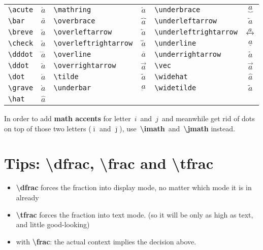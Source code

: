\vspace{0.5em}\noindent
\begin{tabularx}{\textwidth}{Xc|Xc|Xc}
 \verb|\acute| & $\acute{a}$ & \verb|\mathring| & $\mathring{a}$ & \verb|\underbrace| & $\underbrace{a}$ \\
 \verb|\bar| & $\bar{a}$ & \verb|\overbrace| & $\overbrace{a}$ & \verb|\underleftarrow| & $\underleftarrow{a}$ \\
 \verb|\breve| & $\breve{a}$ & \verb|\overleftarrow| & $\overleftarrow{a}$ & \verb|\underleftrightarrow| & $\underleftrightarrow{a}$ \\
 \verb|\check| & $\check{a}$ & \verb|\overleftrightarrow| & $\overleftrightarrow{a}$ & \verb|\underline| & $\underline{a}$ \\
 \verb|\dddot| & $\dddot{a}$ & \verb|\overline| & $\overline{a}$ & \verb|\underrightarrow| & $\underrightarrow{a}$ \\
 \verb|\ddot| & $\ddot{a}$ & \verb|\overrightarrow| & $\overrightarrow{a}$ & \verb|\vec| & $\vec{a}$ \\
 \verb|\dot| & $\dot{a}$ & \verb|\tilde| & $\tilde{a}$ & \verb|\widehat| & $\widehat{a}$ \\
 \verb|\grave| & $\grave{a}$ & \verb|\underbar| & $\underbar{a}$ & \verb|\widetilde| & $\widetilde{a}$ \\
 \verb|\hat| & $\hat{a}$
\end{tabularx}\vspace{0.5em}

In order to add \textbf{math accents} for letter~$i$~and~$j$~and meanwhile get rid of dots on top of those two letters ($\bar{\imath}$ and $\bar{\jmath}$), use~\textbf{\textbackslash imath}~and~\textbf{\textbackslash jmath} instead. 

\section{Tips: \textbackslash dfrac, \textbackslash frac and \textbackslash tfrac}
\begin{itemize}
	\item \textbf{\textbackslash dfrac} forces the fraction into display mode, no matter which mode it is in already
	\item \textbf{\textbackslash tfrac} forces the fraction into text mode. (so it will be only as high as text, and little good-looking)
	\item with \textbf{\textbackslash frac}: the actual context implies the decision above.
\end{itemize}

